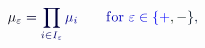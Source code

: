 \documentclass[12pt]{article}
\begin{document}
\makeatletter
\renewcommand*{\@textcolor}[3]{%
  \protect\leavevmode
  \begingroup
    \color#1{#2}#3%
  \endgroup
}
\makeatother
\begin{displaymath}
\mathcolor[RGB]{0,0,15}{\mu} _ { \mathcolor[RGB]{0,0,30}{\varepsilon} } \mathcolor[RGB]{0,0,45}{=} \mathcolor[RGB]{0,0,60}{\prod} _ { \mathcolor[RGB]{0,0,75}{i} \mathcolor[RGB]{0,0,90}{\in} \mathcolor[RGB]{0,0,105}{I} _ { \mathcolor[RGB]{0,0,120}{\varepsilon} } } \mathcolor[RGB]{0,0,135}{\mu} _ { \mathcolor[RGB]{0,0,150}{i} } \qquad \mathrm { \mathcolor[RGB]{0,0,165}{f} \mathcolor[RGB]{0,0,180}{o} \mathcolor[RGB]{0,0,195}{r} ~ } \mathcolor[RGB]{0,0,210}{\varepsilon} \mathcolor[RGB]{0,0,225}{\in} \mathcolor[RGB]{0,0,240}{\{} \mathcolor[RGB]{0,0,255}{+} \mathcolor[RGB]{0,15,0}{,} \mathcolor[RGB]{0,15,15}{-} \mathcolor[RGB]{0,15,30}{\}} \mathcolor[RGB]{0,15,45}{,}
\end{displaymath}
\end{document}
